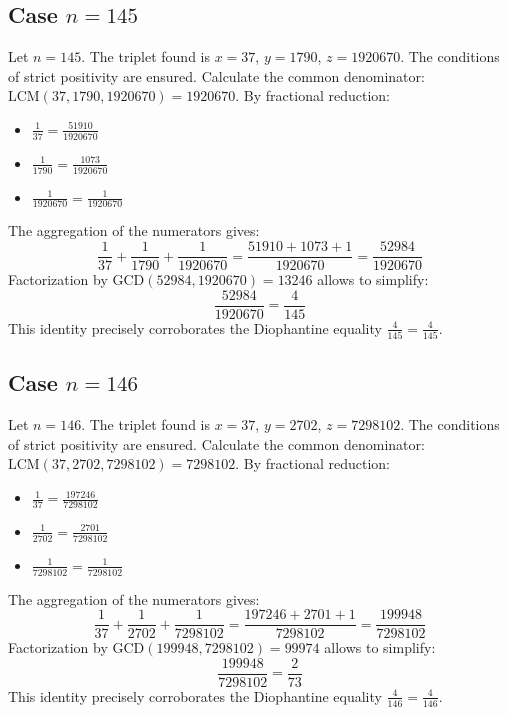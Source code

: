 \documentclass[11pt,a4paper]{article}
\begin{document}
\subsection{Case $n = 145$}
Let $n = 145$. The triplet found is $x = 37$, $y = 1790$, $z = 1920670$.
The conditions of strict positivity are ensured.
Calculate the common denominator: $\text{LCM}(37, 1790, 1920670) = 1920670$.
By fractional reduction:
\begin{itemize}
    \item $\frac{1}{37} = \frac{51910}{1920670}$
    \item $\frac{1}{1790} = \frac{1073}{1920670}$
    \item $\frac{1}{1920670} = \frac{1}{1920670}$
\end{itemize}
The aggregation of the numerators gives:
$$ \frac{1}{37} + \frac{1}{1790} + \frac{1}{1920670} = \frac{51910 + 1073 + 1}{1920670} = \frac{52984}{1920670} $$
Factorization by $\text{GCD}(52984, 1920670) = 13246$ allows to simplify:
$$ \frac{52984}{1920670} = \frac{4}{145} $$
This identity precisely corroborates the Diophantine equality $\frac{4}{145} = \frac{4}{145}$.

\subsection{Case $n = 146$}
Let $n = 146$. The triplet found is $x = 37$, $y = 2702$, $z = 7298102$.
The conditions of strict positivity are ensured.
Calculate the common denominator: $\text{LCM}(37, 2702, 7298102) = 7298102$.
By fractional reduction:
\begin{itemize}
    \item $\frac{1}{37} = \frac{197246}{7298102}$
    \item $\frac{1}{2702} = \frac{2701}{7298102}$
    \item $\frac{1}{7298102} = \frac{1}{7298102}$
\end{itemize}
The aggregation of the numerators gives:
$$ \frac{1}{37} + \frac{1}{2702} + \frac{1}{7298102} = \frac{197246 + 2701 + 1}{7298102} = \frac{199948}{7298102} $$
Factorization by $\text{GCD}(199948, 7298102) = 99974$ allows to simplify:
$$ \frac{199948}{7298102} = \frac{2}{73} $$
This identity precisely corroborates the Diophantine equality $\frac{4}{146} = \frac{4}{146}$.
\end{document}
